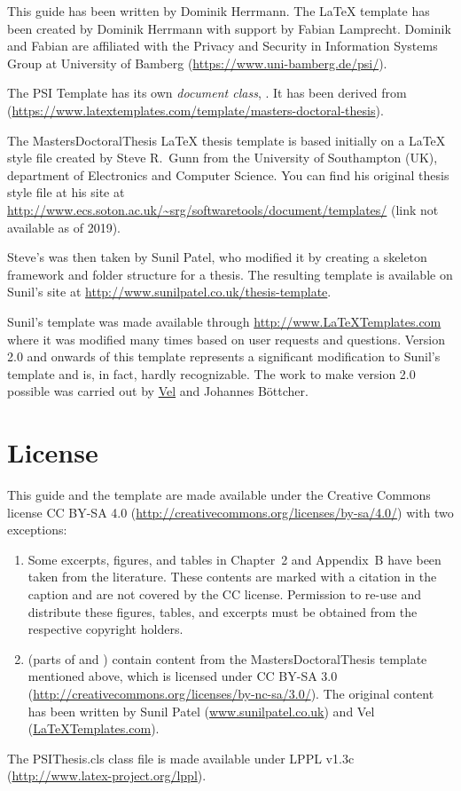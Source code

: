 This guide has been written by Dominik Herrmann. The LaTeX template has been created by Dominik Herrmann with support by Fabian Lamprecht. Dominik and Fabian are affiliated with the Privacy and Security in Information Systems Group at University of Bamberg (\url{https://www.uni-bamberg.de/psi/}).


The PSI Template has its own \emph{document class}, . It has been derived from  (\url{https://www.latextemplates.com/template/masters-doctoral-thesis}).

The MastersDoctoralThesis LaTeX thesis template is based initially on a LaTeX style file created by Steve R.\ Gunn from the University of Southampton (UK), department of Electronics and Computer Science. You can find his original thesis style file at his site at
\url{http://www.ecs.soton.ac.uk/~srg/softwaretools/document/templates/} (link not available as of 2019).

Steve's  was then taken by Sunil Patel, who modified it by creating a skeleton framework and folder structure for a thesis. The resulting template is available on Sunil's site at
\url{http://www.sunilpatel.co.uk/thesis-template}.

Sunil's template was made available through \url{http://www.LaTeXTemplates.com} where it was modified many times based on user requests and questions. Version 2.0 and onwards of this template represents a significant modification to Sunil's template and is, in fact, hardly recognizable. The work to make version 2.0 possible was carried out by \href{mailto:vel@latextemplates.com}{Vel} and Johannes Böttcher.


\section{License}
\label{sec:license}

This guide and the template are made available under the Creative Commons license 
CC BY-SA 4.0 (\url{http://creativecommons.org/licenses/by-sa/4.0/}) with two exceptions:

\begin{enumerate}
\item Some excerpts, figures, and tables in Chapter~2 and Appendix~B have been taken from the
literature. These contents are marked with a citation in the caption and are not
covered by the CC license. Permission to re-use and distribute
these figures, tables, and excerpts must be obtained from the
respective copyright holders.

\item (parts of  and ) contain content from the
MastersDoctoralThesis template mentioned above, which is licensed under 
CC BY-SA 3.0 (\url{http://creativecommons.org/licenses/by-nc-sa/3.0/}). 
The original content has been written by
Sunil Patel (\href{http://www.sunilpatel.co.uk}{www.sunilpatel.co.uk}) and
Vel (\href{http://www.LaTeXTemplates.com}{LaTeXTemplates.com}).
\end{enumerate}

The PSIThesis.cls class file is made available under
LPPL v1.3c (\url{http://www.latex-project.org/lppl}).
